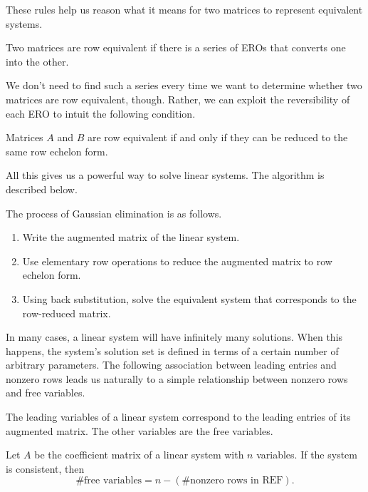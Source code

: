 \documentclass[../m073main.tex]{subfiles}
\begin{document}
These rules help us reason what it means for two matrices to represent equivalent systems.

\begin{definition}
	Two matrices are row equivalent if there is a series of EROs that converts one into the other.
\end{definition}

We don't need to find such a series every time we want to determine whether two matrices are row equivalent, though.
Rather, we can exploit the reversibility of each ERO to intuit the following condition.

\begin{theorem}
	Matrices $A$ and $B$ are row equivalent if and only if they can be reduced to the same row echelon form.
\end{theorem}

All this gives us a powerful way to solve linear systems.
The algorithm is described below.

\begin{definition}
	The process of Gaussian elimination is as follows.
	\begin{enumerate}
		\item Write the augmented matrix of the linear system.
		\item Use elementary row operations to reduce the augmented matrix to row echelon form.
		\item Using back substitution, solve the equivalent system that corresponds to the row-reduced matrix.
	\end{enumerate}
\end{definition}

In many cases, a linear system will have infinitely many solutions.
When this happens, the system's solution set is defined in terms of a certain number of arbitrary parameters.
The following association between leading entries and nonzero rows leads us naturally to a simple relationship between nonzero rows and free variables.

\begin{definition}
	The leading variables of a linear system correspond to the leading entries of its augmented matrix.
	The other variables are the free variables.
\end{definition}

\begin{theorem}
	Let $A$ be the coefficient matrix of a linear system with $n$ variables.
	If the system is consistent, then
	\[ \text{\# free variables} = n - (\text{\# nonzero rows in REF}). \]
\end{theorem}
\end{document}
